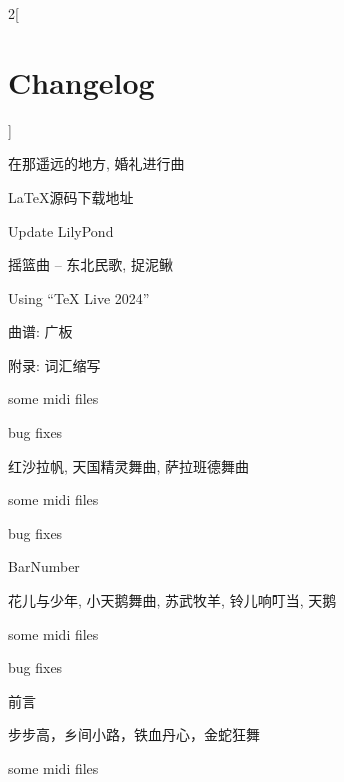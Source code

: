 {\begin{multicols*}{2}[\section*{Changelog}]
\begin{changelog}[author=李小丹, section=false]
\begin{version}[v=3.6-$\beta$(3.1415), date=2024-08-08]
	\added
		\item 在那遥远的地方, 婚礼进行曲
		\item \LaTeX{}源码下载地址
	\changed
		\item Update LilyPond
\end{version}
\begin{version}[v=3.5-$\beta$(3.1415), date=2024-04-03]
	\added
		\item 摇篮曲 -- 东北民歌, 捉泥鳅
	\changed
		\item Using ``TeX Live 2024''
\end{version}
\begin{version}[v=3.4-$\beta$(3.1415), date=2024-02-27]
	\added
		\item 曲谱: 广板
		\item 附录: 词汇缩写
		\item some midi files
	\fixed
		\item bug fixes
\end{version}
\begin{version}[v=3.3-$\beta$(3.1415), date=2024-02-07]
	\added
		\item 红沙拉帆, 天国精灵舞曲, 萨拉班德舞曲
		\item some midi files
	\fixed
		\item bug fixes
	\changed
		\item BarNumber
\end{version}
\begin{version}[v=3.2-$\beta$(3.1415), date=2024-01-04]
	\added
		\item 花儿与少年, 小天鹅舞曲, 苏武牧羊, 铃儿响叮当, 天鹅
		\item some midi files
	\fixed
		\item bug fixes
	\changed
		\item 前言
\end{version}
\begin{version}[v=3.1-$\beta$(3.1415), date=2023-12-28]
	\added
		\item 步步高，乡间小路，铁血丹心，金蛇狂舞
		\item some midi files
\end{version}
\begin{version}[v=3.0-$\beta$(3.1415), date=2023-12-22]

\end{version}
\end{changelog}
\end{multicols*}}
